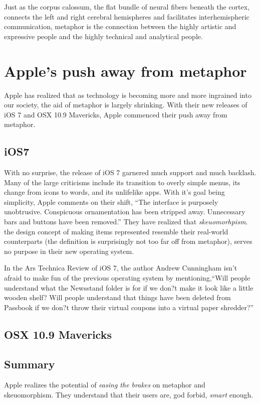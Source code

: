 \documentclass[11pt, oneside]{article}   	%
\begin{document}
Just as the corpus calossum, the flat bundle of neural fibers beneath the cortex, connects the left and right cerebral hemispheres and facilitates interhemispheric communication, metaphor is the connection between the highly artistic and expressive people and the highly  technical and analytical people.

\cite{bae16}

\section{Apple's push away from metaphor}
Apple has realized that as technology is becoming more and more ingrained into our society, the aid of metaphor is largely shrinking. With their new releases of iOS 7 and OSX 10.9 Mavericks, Apple commenced their push away from metaphor.

\subsection{iOS7}
With no surprise, the release of iOS 7 garnered much support and much backlash. Many of the large criticisms include its transition to overly simple menus, its change from icons to words, and its unlifelike apps. With it's goal being simplicity, Apple comments on their shift, ``The interface is purposely unobtrusive. Conspicuous ornamentation has been stripped away. Unnecessary bars and buttons have been removed.'' \cite{apple-design} They have realized that \textit{skeuomorhpism}. the design concept of making items represented resemble their real-world counterparts (the definition is surprisingly not too far off from metaphor), serves no purpose in their new operating system.

In the Ars Technica Review of iOS 7, the author Andrew Cunningham isn't afraid to make fun of the previous operating system by mentioning,``Will people understand what the Newsstand folder is for if we don?t make it look like a little wooden shelf? Will people understand that things have been deleted from Passbook if we don?t throw their virtual coupons into a virtual paper shredder?'' \cite{ars-technica-iOS7} 

\subsection{OSX 10.9 Mavericks}
 \cite{ars-technica-mavericks} 
 
\subsection{Summary}
Apple realizes the potential of \textit{easing the brakes} on metaphor and skeuomorphism. They understand that their users are, god forbid, \textit{smart} enough. 
\end{document}
